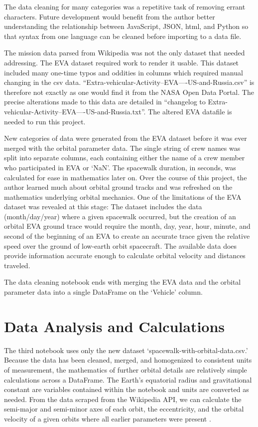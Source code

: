 \documentclass[sigconf]{acmart}
\begin{document}
The data cleaning for many categories was a repetitive task of removing errant characters. Future development would benefit from the author better understanding the relationship between JavaScript, JSON, html, and Python so that syntax from one language can be cleaned before importing to a data file.

The mission data parsed from Wikipedia was not the only dataset that needed addressing. The EVA dataset required work to render it usable. This dataset included many one-time typos and oddities in columns which required manual changing in the csv data. “Extra-vehicular-Activity--EVA----US-and-Russia.csv” is therefore not exactly as one would find it from the NASA Open Data Portal. The precise alterations made to this data are detailed in  “changelog to Extra-vehicular-Activity--EVA----US-and-Russia.txt”. The altered EVA datafile is needed to run this project. 

New categories of data were generated from the EVA dataset before it was ever merged with the orbital parameter data. The single string of crew names was split into separate columns, each containing either the name of a crew member who participated in EVA or ‘NaN’. The spacewalk duration, in seconds, was calculated for ease in mathematics later on. 
Over the course of this project, the author learned much about orbital ground tracks and was refreshed on the mathematics underlying orbital mechanics. One of the limitations of the EVA dataset was revealed at this stage: The dataset includes the data (month/day/year) where a given spacewalk occurred, but the creation of an orbital EVA ground trace would require the month, day, year, hour, minute, and second of the beginning of an EVA to create an accurate trace given the relative speed over the ground of low-earth orbit spacecraft. The available data does provide information accurate enough to calculate orbital velocity and distances traveled. 

The data cleaning notebook ends with merging the EVA data and the orbital parameter data into a single DataFrame on the ‘Vehicle’ column.

\section{Data Analysis and Calculations}
The third notebook uses only the new dataset ‘spacewalk-with-orbital-data.csv.’ Because the data has been cleaned, merged, and homogenized to consistent units of measurement, the mathematics of further orbital details are relatively simple calculations across a DataFrame.  The Earth’s equatorial radius and gravitational constant \cite{Williams2016} are variables contained within the notebook and units are converted as needed.  
From the data scraped from the Wikipedia API, we can calculate the semi-major and semi-minor axes of each orbit, the eccentricity, and the orbital velocity of a given orbits where all earlier parameters were present \cite{Wolfson2007}. 
\end{document}
